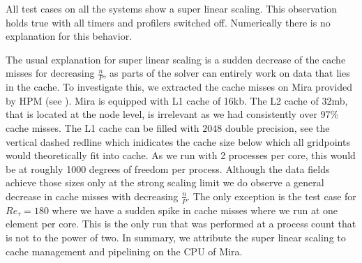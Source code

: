 \documentclass{sig-alternate}
\begin{document}
All test cases on all the systems show a super linear scaling. This
observation holds true with all timers and profilers switched off.
Numerically there is no explanation for this behavior. 

The usual explanation for super linear scaling is a sudden decrease of the cache
misses for decreasing $\frac{n}{P}$, as parts of the solver can entirely work on
data that lies in the cache. 
To investigate this, we extracted the cache misses on Mira provided by HPM (see
). Mira is equipped with L1 cache of 16kb. The L2 cache
of 32mb, that is located at the node level, is irrelevant as we had consistently
over 97\% cache misses. The L1 cache can be filled with $2048$ double precision, see
 the vertical dashed redline which inidicates the cache size below which all gridpoints would theoretically fit into cache. As we run with 2 processes per core, this would be at roughly 1000
degrees of freedom per process. Although the data fields achieve those sizes only at the strong scaling
limit we do observe a general decrease in cache misses with decreasing
$\frac{n}{P}$. The only exception is the test case for $Re_{\tau}=180$ where we
have a sudden spike in cache misses where we run at one element per core. This
is the only run that was performed at a process count that is not to the power
of two.
In summary, we attribute the super linear scaling to cache
management and pipelining on the CPU of Mira. 
\end{document}
